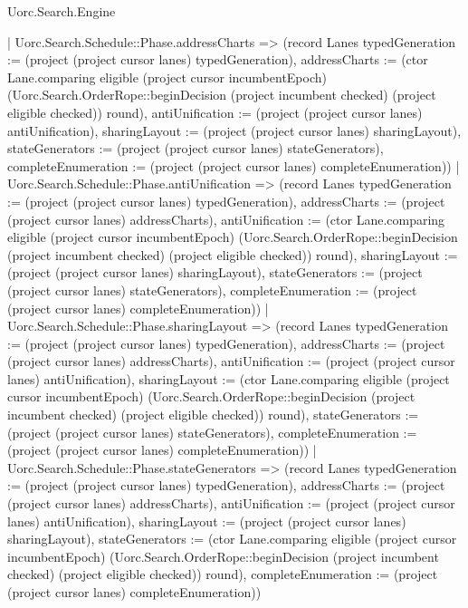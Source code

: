 \begin{lexlean}{Uorc.Search.Engine}
\begin{semanticmodule}
{{          | Uorc.Search.Schedule::Phase.addressCharts => (record Lanes {typedGeneration := (project (project cursor lanes) typedGeneration), addressCharts := (ctor Lane.comparing eligible (project cursor incumbentEpoch) (Uorc.Search.OrderRope::beginDecision (project incumbent checked) (project eligible checked)) round), antiUnification := (project (project cursor lanes) antiUnification), sharingLayout := (project (project cursor lanes) sharingLayout), stateGenerators := (project (project cursor lanes) stateGenerators), completeEnumeration := (project (project cursor lanes) completeEnumeration)})
          | Uorc.Search.Schedule::Phase.antiUnification => (record Lanes {typedGeneration := (project (project cursor lanes) typedGeneration), addressCharts := (project (project cursor lanes) addressCharts), antiUnification := (ctor Lane.comparing eligible (project cursor incumbentEpoch) (Uorc.Search.OrderRope::beginDecision (project incumbent checked) (project eligible checked)) round), sharingLayout := (project (project cursor lanes) sharingLayout), stateGenerators := (project (project cursor lanes) stateGenerators), completeEnumeration := (project (project cursor lanes) completeEnumeration)})
          | Uorc.Search.Schedule::Phase.sharingLayout => (record Lanes {typedGeneration := (project (project cursor lanes) typedGeneration), addressCharts := (project (project cursor lanes) addressCharts), antiUnification := (project (project cursor lanes) antiUnification), sharingLayout := (ctor Lane.comparing eligible (project cursor incumbentEpoch) (Uorc.Search.OrderRope::beginDecision (project incumbent checked) (project eligible checked)) round), stateGenerators := (project (project cursor lanes) stateGenerators), completeEnumeration := (project (project cursor lanes) completeEnumeration)})
          | Uorc.Search.Schedule::Phase.stateGenerators => (record Lanes {typedGeneration := (project (project cursor lanes) typedGeneration), addressCharts := (project (project cursor lanes) addressCharts), antiUnification := (project (project cursor lanes) antiUnification), sharingLayout := (project (project cursor lanes) sharingLayout), stateGenerators := (ctor Lane.comparing eligible (project cursor incumbentEpoch) (Uorc.Search.OrderRope::beginDecision (project incumbent checked) (project eligible checked)) round), completeEnumeration := (project (project cursor lanes) completeEnumeration)})
}}
\end{semanticmodule}
\end{lexlean}

